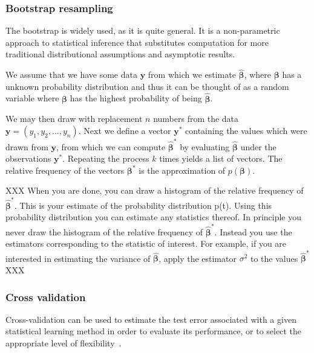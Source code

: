 \documentclass[reprint,english,notitlepage]{revtex4-1}  %
\begin{document}
\subsubsection{Bootstrap resampling}
The bootstrap is widely used, as it is quite general. 
It is a non-parametric approach to statistical inference that substitutes computation for more traditional distributional assumptions and asymptotic results. 

We assume that we have some data $\boldsymbol{y}$ from which we estimate $\boldsymbol{\hat{\beta}}$, where $\boldsymbol{\beta}$ has a unknown probability distribution and thus it can be thought of as a random variable where $\boldsymbol{\beta}$ has the highest probability of being $\boldsymbol{\hat{\beta}}$. 

We may then draw with replacement $n$ numbers from the data $\boldsymbol{y} = (y_1, y_2, ..., y_n)$. Next we define a vector $\boldsymbol{y^*}$ containing the values which were drawn from $\boldsymbol{y}$, from which we can compute $\boldsymbol{\hat{\beta}}^*$ by evaluating $\boldsymbol{\hat{\beta}}$ under the observations $\boldsymbol{y}^*$. Repeating the process $k$ times yields a list of vectors. 
The relative frequency of the vectors $\boldsymbol{\beta}^*$ is the approximation of $p(\boldsymbol{\beta})$. 

XXX
When you are done, you can draw a histogram of the relative frequency of $\boldsymbol{\hat{\beta}}^*$. This is your estimate of the probability distribution p(t). Using this probability distribution you can estimate any statistics thereof. In principle you never draw the histogram of the relative frequency of $\boldsymbol{\hat{\beta}}^*$. Instead you use the estimators corresponding to the statistic of interest. For example, if you are interested in estimating the variance of $\boldsymbol{\hat{\beta}}$, apply the estimator $\sigma^2$ to the values $\boldsymbol{\hat{\beta}}^*$
XXX 

\subsubsection{Cross validation}
Cross-validation can be used to estimate the test error associated with a given statistical learning method in order to evaluate its performance, or to select the appropriate level of flexibility~\cite{morthen}. 
\end{document}
